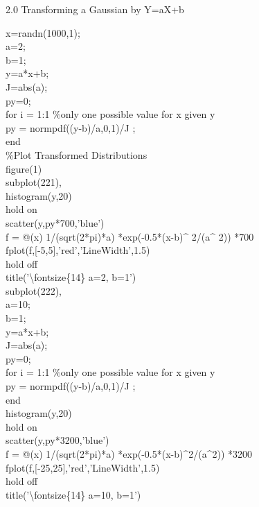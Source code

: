 \documentclass[twoside,twocolumn]{article}
\begin{document}
\begin{large}
2.0 Transforming a Gaussian by Y=aX+b
\end{large}
\newline
\begin{itshape}
x=randn(1000,1);\\
a=2;\\
b=1;\\
y=a*x+b;\\
J=abs(a);\\

py=0;\\
for i = 1:1 \%only one possible value for x given y\\
    py = normpdf((y-b)/a,0,1)/J ;\\
end\\
    
\%Plot Transformed Distributions\\
figure(1)\\
subplot(221),\\
histogram(y,20)\\
hold on\\
scatter(y,py*700,'blue')\\
f = @(x) 1/(sqrt(2*pi)*a) *exp(-0.5*(x-b)\^{} 2/(a\^{} 2)) *700\\
fplot(f,[-5,5],'red','LineWidth',1.5)\\
hold off\\
title('\textbackslash fontsize\{14\} a=2, b=1')\\

subplot(222),\\
a=10;\\
b=1;\\
y=a*x+b;\\
J=abs(a);\\
py=0;\\
for i = 1:1 \%only one possible value for x given y\\
    py = normpdf((y-b)/a,0,1)/J ;\\
end\\
histogram(y,20)\\
hold on\\
scatter(y,py*3200,'blue')\\
f = @(x) 1/(sqrt(2*pi)*a) *exp(-0.5*(x-b)\^{}2/(a\^{}2)) *3200\\
fplot(f,[-25,25],'red','LineWidth',1.5)\\
hold off\\
title('\textbackslash fontsize\{14\} a=10, b=1')\\


\end{itshape}
\end{document}

